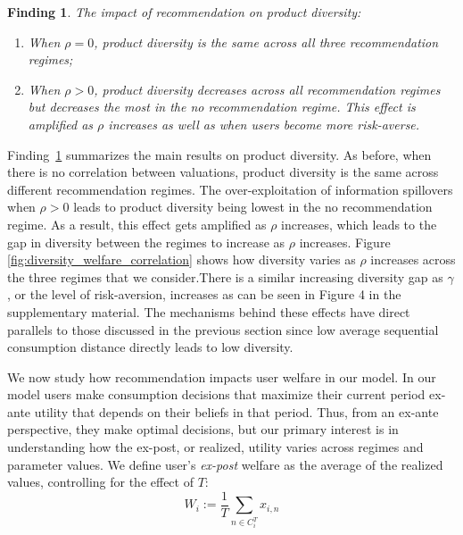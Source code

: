 \documentclass[format=acmsmall, review=false]{acmart}
\newtheorem{finding}{Finding}
\begin{document}
\begin{finding}\label{finding_diversity}
The impact of recommendation on product diversity:
\begin{enumerate}
\item When $\rho = 0$, product diversity is the same across all three recommendation regimes;
\item When $\rho > 0$, product diversity decreases across all recommendation regimes but decreases the most in the no recommendation regime. This effect is amplified as $\rho$ increases as well as when users become more risk-averse.
\end{enumerate}
\end{finding}
\par 
Finding~\ref{finding_diversity} summarizes the main results on product diversity. As before, when there is no correlation between valuations, product diversity is the same across different recommendation regimes. The over-exploitation of information spillovers when $\rho > 0$ leads to product diversity being lowest in the no recommendation regime. As a result, this effect gets amplified as $\rho$ increases, which leads to the gap in diversity between the regimes to increase as $\rho$ increases. Figure \ref{fig:diversity_welfare_correlation} shows how diversity varies as $\rho$ increases across the three regimes that we consider.There is a similar increasing diversity gap as $\gamma$, or the level of risk-aversion, increases as can be seen in Figure 4 in the supplementary material. The mechanisms behind these effects have direct parallels to those discussed in the previous section since low average sequential consumption distance directly leads to low diversity.
\par 
We now study how recommendation impacts user welfare in our model. In our model users make consumption decisions that maximize their current period ex-ante utility that depends on their beliefs in that period. Thus, from an ex-ante perspective, they make optimal decisions, but our primary interest is in understanding how the ex-post, or realized, utility varies across regimes and parameter values. We define user's \textit{ex-post} welfare as the average of the realized values, controlling for the effect of $T$:
$$W_i:= \frac{1}{T}\sum_{n \in C_i^T} x_{i,n}$$
\end{document}
